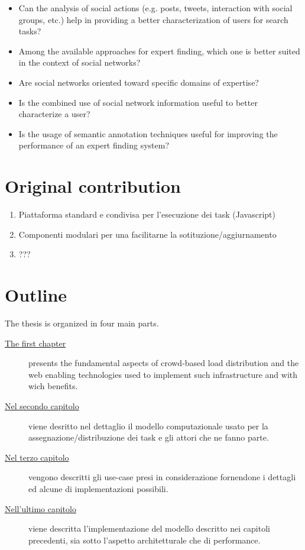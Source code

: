 \begin{itemize}
	\item Can the analysis of social actions (e.g. posts, tweets, interaction with
	social groups, etc.) help in providing a better characterization of users for
	search tasks?
	\item Among the available approaches for expert finding, which one is better
	suited in the context of social networks?
	\item Are social networks oriented toward specific domains of expertise? 
	\item Is the combined use of social network information useful to better
	characterize a user?	
	\item Is the usage of semantic annotation techniques useful for improving
	the performance of an expert finding system?
\end{itemize}


\section*{Original contribution}
\begin{enumerate}
	\item Piattaforma standard e condivisa per l'esecuzione dei task (Javascript)
	\item Componenti modulari per una facilitarne la sotituzione/aggiurnamento
	\item ???

\end{enumerate}

\section*{Outline}
The thesis is organized in four main parts.

\begin{description}
\item[{\hyperref[cap:bg]{The first chapter}}]
presents the fundamental aspects of crowd-based load distribution and the web enabling
technologies used to implement such infrastructure and with wich benefits.

\item[{\hyperref[cap:model]{Nel secondo capitolo}}]
viene desritto nel dettaglio il modello computazionale usato per la assegnazione/distribuzione dei task
e gli attori che ne fanno parte.

\item[{\hyperref[cap:cases]{Nel terzo capitolo}}]
vengono descritti gli use-case presi in considerazione fornendone i dettagli ed alcune di implementazioni possibili.

\item[{\hyperref[cap:implementation]{Nell'ultimo capitolo}}]
viene descritta l'implementazione del modello descritto nei capitoli precedenti, sia sotto l'aspetto architetturale
che di performance.

\end{description}